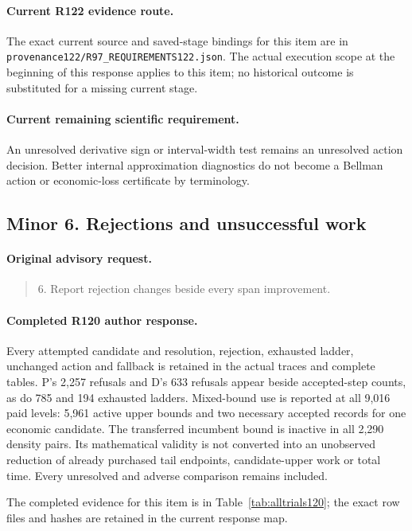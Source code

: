 \paragraph{Current R122 evidence route.}
The exact current source and saved-stage bindings for this item are in \nolinkurl{provenance122/R97_REQUIREMENTS122.json}. The actual execution scope at the beginning of this response applies to this item; no historical outcome is substituted for a missing current stage.
\paragraph{Current remaining scientific requirement.}
An unresolved derivative sign or interval-width test remains an unresolved action decision. Better internal approximation diagnostics do not become a Bellman action or economic-loss certificate by terminology.

\subsection{Minor 6. Rejections and unsuccessful work}
\label{response122:minor-6}

\paragraph{Original advisory request.}
\begin{quote}
6. Report rejection changes beside every span improvement.
\end{quote}

\paragraph{Completed R120 author response.}
Every attempted candidate and resolution, rejection, exhausted ladder, unchanged action and fallback is retained in the actual traces and complete tables. P's 2,257 refusals and D's 633 refusals appear beside accepted-step counts, as do 785 and 194 exhausted ladders. Mixed-bound use is reported at all 9,016 paid levels: 5,961 active upper bounds and two necessary accepted records for one economic candidate. The transferred incumbent bound is inactive in all 2,290 density pairs. Its mathematical validity is not converted into an unobserved reduction of already purchased tail endpoints, candidate-upper work or total time. Every unresolved and adverse comparison remains included.

The completed evidence for this item is in Table~\ref{tab:alltrials120}; the exact row files and hashes are retained in the current response map.

